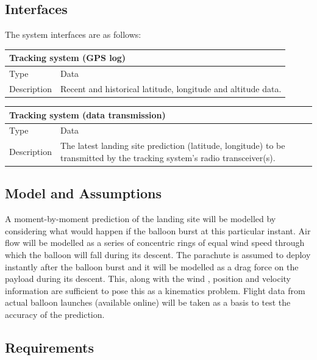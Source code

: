 \documentclass[11pt]{article}
\begin{document}
\subsection{Interfaces}

The system interfaces are as follows:

\begin{table}[!htbp] \centering
 \begin{tabular}{|p{2cm} | p{11cm}|}
 \hline
  \multicolumn{2}{|l|}{Tracking system (GPS log)} \\
  \hline
  Type & Data \\
  \hline
  Description & Recent and historical latitude, longitude and altitude data.  \\
  \hline
 \end{tabular}
\end{table}

\begin{table}[!h] \centering
 \begin{tabular}{|p{2cm} | p{11cm}|}
 \hline
  \multicolumn{2}{|l|}{Tracking system (data transmission)} \\
  \hline
  Type & Data \\
  \hline
  Description & The latest landing site prediction (latitude, longitude) to be transmitted by the tracking system’s radio transceiver(s). \\
  \hline
 \end{tabular}
\end{table}

\subsection{Model and Assumptions}

A moment-by-moment prediction of the landing site will be modelled by considering what would happen if the balloon burst at this particular instant. Air flow will be modelled as a series of concentric rings of equal wind speed through which the balloon will fall during its descent. The parachute is assumed to deploy instantly after the balloon burst and it will be modelled as a drag force on the payload during its descent. This, along with the wind , position and velocity information are sufficient to pose this as a kinematics problem. Flight data from actual balloon launches (available online) will be taken as a basis to test the accuracy of the prediction.

\subsection{Requirements}
\end{document}
